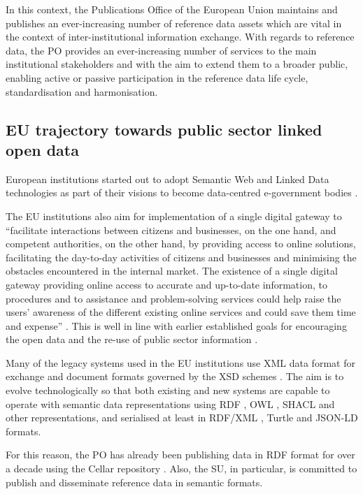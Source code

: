 	In this context, the Publications Office of the European Union maintains and publishes an ever-increasing number of reference data assets which are vital in the context of inter-institutional information exchange. With regards to reference data, the PO provides an ever-increasing number of services to the main institutional stakeholders and with the aim to extend them to a broader public, enabling active or passive participation in the reference data life cycle, standardisation and harmonisation.

	\subsection{EU trajectory towards public sector linked open data}
	
	European institutions started out to adopt Semantic Web and Linked Data technologies as part of their visions to become data-centred e-government bodies \citep{decission-456/2005/EC,decission-2015/2240}. 
	
	The EU institutions also aim for implementation of a single digital gateway to ``facilitate interactions between citizens and businesses, on the one hand, and competent authorities, on the other hand, by providing access to online solutions, facilitating the day-to-day activities of citizens and businesses and minimising the obstacles encountered in the internal market. The existence of a single digital gateway providing online access to accurate and up-to-date information, to procedures and to assistance and problem-solving services could help raise the users' awareness of the different existing online services and could save them time and expense'' \citep{directive-2018/1724}. This is well in line with earlier established goals for encouraging the open data and the re-use of public sector information \citep{directive-2013/37/EU,directive-2019/1024}.

	Many of the legacy systems used in the EU institutions use XML data format for exchange and document formats governed by the XSD schemes \citep{xsd1.1-spec}. The aim is to evolve technologically so that both existing and new systems are capable to operate with semantic data representations using RDF \citep{rdf11}, OWL \citep{owl2.0,owl2}, SHACL \citep{shacl-spec} and other representations, and serialised at least in RDF/XML \citep{rdf-xml-Beckett:04:RSS,rdf-xml-Schreiber:14:RXS}, Turtle \citep{turtle-Carothers:14:RT} and JSON-LD \citep{spornyjson,sporny2014json} formats.
	
	For this reason, the PO has already been publishing data in RDF format for over a decade using the Cellar repository \citep{cdm-francesconi2015ontology}. Also, the SU, in particular, is committed to publish and disseminate reference data in semantic formats. 
	
